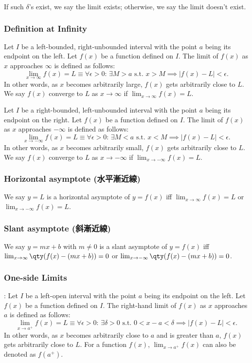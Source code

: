 \documentclass[a4paper,12pt]{report}
\begin{document}
If such $\delta$'s exist, we say the limit exists; otherwise, we say the limit doesn't exist.
\subsubsection{Definition at Infinity}
Let \(I\) be a left-bounded, right-unbounded interval with the point \(a\) being its endpoint on the left. Let \( f(x) \) be a function defined on \(I\). The limit of \( f(x) \) as \( x \) approaches \( \infty \) is defined as follows:
\[\lim_{x \to \infty} f(x) = L \equiv \forall \epsilon > 0: \, \exists M > a \text{\ s.t.\ } x > M \implies |f(x) - L| < \epsilon.\]
In other words, as \(x\) becomes arbitrarily large, \(f(x)\) gets arbitrarily close to \(L\). We say $f(x)$ converge to $L$ as $x\to\infty$ if $\lim_{x \to \infty} f(x) = L$.

Let \(I\) be a right-bounded, left-unbounded interval with the point \(a\) being its endpoint on the right. Let \( f(x) \) be a function defined on \(I\). The limit of \( f(x) \) as \( x \) approaches \( -\infty \) is defined as follows:
\[\lim_{x \to -\infty} f(x) = L \equiv \forall \epsilon > 0: \, \exists M < a \text{\ s.t.\ } x < M \implies |f(x) - L| < \epsilon.\]
In other words, as \(x\) becomes arbitrarily small, \(f(x)\) gets arbitrarily close to \(L\). We say $f(x)$ converge to $L$ as $x\to-\infty$ if $\lim_{x \to -\infty} f(x) = L$.
\subsubsection{Horizontal asymptote (水平漸近線)}
We say $y=L$ is a horizontal asymptote of $y=f(x)$ iff $\lim_{x \to \infty} f(x)=L$ or $\lim_{x \to -\infty} f(x)=L$.
\subsubsection{Slant asymptote (斜漸近線)}
We say $y=mx+b$ with $m\neq 0$ is a slant asymptote of $y=f(x)$ iff $\lim_{x \to \infty} \qty(f(x)-(mx+b))=0$ or $\lim_{x \to -\infty} \qty(f(x)-(mx+b))=0$.
\subsubsection{One-side Limits}
: Let \(I\) be a left-open interval with the point \(a\) being its endpoint on the left. Let \( f(x) \) be a function defined on \(I\). The right-hand limit of \( f(x) \) as \( x \) approaches \( a \) is defined as follows:
\[\lim_{x \to a^+} f(x) = L \equiv \forall \epsilon > 0 :\,\exists \delta > 0 \text{\ s.t.\ } 0 < x - a < \delta \implies |f(x) - L| < \epsilon.\]
In other words, as \(x\) becomes arbitrarily close to \(a\) and is greater than \(a\), \(f(x)\) gets arbitrarily close to \(L\). For a function $f(x)$, $\lim_{x\to a^+}f(x)$ can also be denoted as $f(a^+)$.
\end{document}

